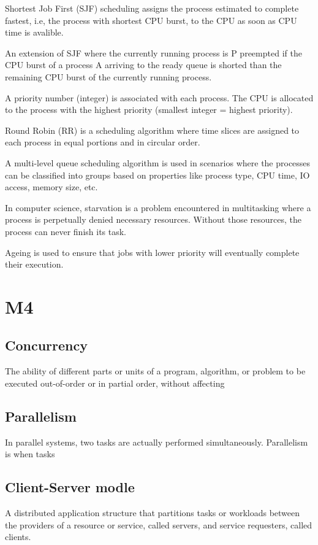 Shortest Job First (SJF) scheduling assigns the process
estimated to complete fastest, i.e, the process with
shortest CPU burst, to the CPU as soon as CPU time is avalible. \newline

An extension of SJF where the currently running process is P
preempted if the CPU burst of a process A arriving to the ready
queue is shorted than the remaining CPU burst of the currently
running process. \newline

A priority number (integer) is associated with each process.
The CPU is allocated to the process with the highest priority
(smallest integer = highest priority). \newline

Round Robin (RR) is a scheduling algorithm where time slices
are assigned to each process in equal portions and in circular
order. \newline

A multi-level queue scheduling algorithm is used in scenarios where
the processes can be classified into groups based on properties like
process type, CPU time, IO access, memory size, etc. \newline

In computer science, starvation is a problem encountered in
multitasking where a process is perpetually denied necessary
resources. Without those resources, the process can never finish its
task. \newline

Ageing is used to ensure that jobs with lower
priority will eventually complete their
execution.

\section{M4}
\subsection{Concurrency}
The ability of different parts or units of a
program, algorithm, or problem to be executed
out-of-order or in partial order, without affecting

\subsection{Parallelism}
In parallel systems, two tasks
are actually performed
simultaneously.
Parallelism is when tasks

\subsection{Client-Server modle}
A distributed application structure that partitions
tasks or workloads between the providers of a
resource or service, called servers, and service
requesters, called clients.

